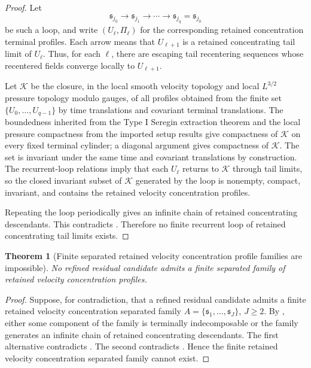 \documentclass[11pt]{amsart}
\numberwithin{equation}{section}
\theoremstyle{plain}
\newtheorem{theorem}{Theorem}[section]
\theoremstyle{definition}
\theoremstyle{remark}
\newcommand{\calK}{\mathcal K}
\begin{document}
\begin{proof}
Let
\[
   \mathfrak s_{j_0}\to\mathfrak s_{j_1}\to\cdots
   \to\mathfrak s_{j_q}=\mathfrak s_{j_0}
\]
be such a loop, and write \((U_\ell,\Pi_\ell)\) for the corresponding retained
concentration terminal profiles.  Each arrow means that \(U_{\ell+1}\) is a
retained concentrating tail limit of \(U_\ell\).  Thus, for each \(\ell\), there are escaping
tail recentering sequences whose recentered fields converge locally to \(U_{\ell+1}\).

Let \(\calK\) be the closure, in the local smooth velocity topology and local
\(L^{3/2}\) pressure topology modulo gauges, of all profiles obtained from the
finite set \(\{U_0,\dots,U_{q-1}\}\) by time translations and covariant
terminal translations.  The boundedness inherited from the Type I Seregin
extraction theorem and the local pressure compactness from
the imported setup results give compactness of \(\calK\) on every fixed terminal
cylinder; a diagonal argument gives compactness of \(\calK\).  The set is
invariant under the same time and covariant translations by construction.  The
recurrent-loop relations imply that each \(U_\ell\)
returns to \(\calK\) through tail limits, so the closed invariant subset of
\(\calK\) generated by the loop is nonempty, compact, invariant, and contains
the retained velocity concentration profiles.

Repeating the loop periodically gives an infinite chain of retained concentrating descendants.
This contradicts .  Therefore no finite
recurrent loop of retained concentrating tail limits exists.
\end{proof}

\begin{theorem}[Finite separated retained velocity concentration profile families are impossible]
\label{thm:no-finite-separated-profile-family}
No refined residual candidate admits a finite separated family of retained
velocity concentration profiles.
\end{theorem}

\begin{proof}
Suppose, for contradiction, that a refined residual candidate admits a finite
retained velocity concentration separated family \(A=\{\mathfrak s_1,\dots,\mathfrak s_J\}\),
\(J\ge2\).  By , either some component of the
family is terminally indecomposable or the family generates an infinite chain of
retained concentrating descendants.  The first alternative contradicts
.  The second contradicts
.  Hence the finite retained velocity concentration
separated family cannot exist.
\end{proof}
\end{document}
